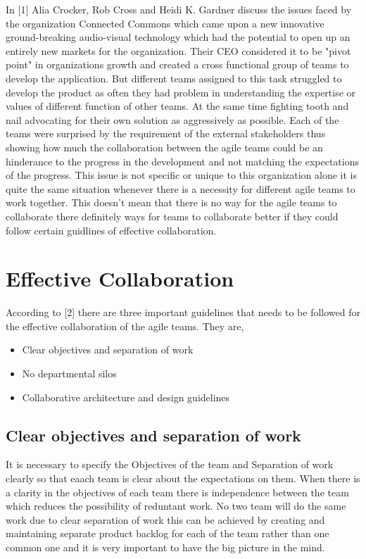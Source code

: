 \documentclass[sigconf]{acmart}
\begin{document}
In [1] Alia Crocker, Rob Cross and Heidi K. Gardner discuss the issues faced by the organization Connected Commons which came upon a new innovative ground-breaking audio-visual technology which had the potential to open up an entirely new markets for the organization. Their CEO considered it to be "pivot point" in organizations growth and created a cross functional group of teams to develop the application. But different teams assigned to this task struggled to develop the product as often they had problem in understanding the expertise or values of different function of other teams. At the same time fighting tooth and nail advocating for their own solution as aggressively as possible. Each of the teams were surprised by the requirement of the external stakeholders thus showing how much the collaboration between the agile teams could be an hinderance to the progress in the development and not matching the expectations of the progress. This issue is not specific or unique to this organization alone it is quite the same situation whenever there is a necessity for different agile teams to work together.  This doesn't mean that there is no way for the agile teams to collaborate there definitely ways for teams to collaborate better if they could follow certain guidlines of effective collaboration.

\section{Effective Collaboration}

According to [2] there are three important guidelines that needs to be followed for the effective collaboration of the agile teams. They are,

\begin{itemize}
  \item Clear objectives and separation of work
  \item No departmental silos
  \item Collaborative architecture and design guidelines
\end{itemize}
\subsection{Clear objectives and separation of work}

It is necessary to specify the Objectives of the team and Separation of work clearly so that eaach team is clear about the expectations on them. When there is a clarity in the objectives of each team there is independence between the team which reduces the possibility of reduntant work. No two team will do the same work due to clear separation of work this can be achieved by creating and maintaining separate product backlog for each of the team rather than one common one and it is very important to have the big picture in the mind. 
\end{document}

